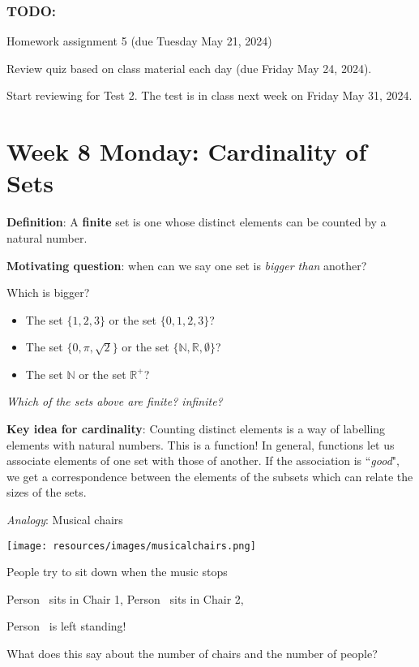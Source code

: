 \documentclass[12pt, oneside]{article}
\begin{document}
\subsubsection*{TODO:}
\begin{list}
   {\itemsep2pt}
   \item Homework assignment 5 (due Tuesday May 21, 2024)
   \item Review quiz based on class material each day (due Friday May 24, 2024).
   \item Start reviewing for Test 2. The test is in class next week on Friday May 31, 2024.

\end{list}

\newpage

\section*{Week 8 Monday: Cardinality of Sets}



{\bf Definition}: A {\bf finite} set is one whose distinct elements can be counted by a natural number.
 

{\bf Motivating question}: when can we say one set is {\it bigger than} another?

Which is bigger? 
\begin{itemize}
    \item The set $\{1,2,3\}$ or the set $\{0,1,2,3\}$?
    \item The set $\{0, \pi, \sqrt{2} \}$ or the set $\{\mathbb{N}, \mathbb{R}, \emptyset\}$?
    \item The set $\mathbb{N}$ or the set $\mathbb{R}^+$?
\end{itemize}

{\it Which of the sets above are finite? infinite?} 

{\bf Key idea for cardinality}: Counting 
distinct elements is a way of labelling elements
with natural numbers. This is a function!
In general, functions let us 
associate elements of one set with those
of another. If the association is ``{\it good}", 
we get a correspondence between the elements of the subsets
which can relate the sizes of the sets. 

{\it Analogy}: Musical chairs

\begin{multicols}{2}
\texttt{[image: resources/images/musicalchairs.png]}
\columnbreak

People try to sit down when the music stops

Person\sun~ sits in Chair 1,
Person\smiley~ sits in Chair 2,

Person\frownie~  is left standing!
\end{multicols}
What does this say about the number of chairs and the number of people?
\end{document}
